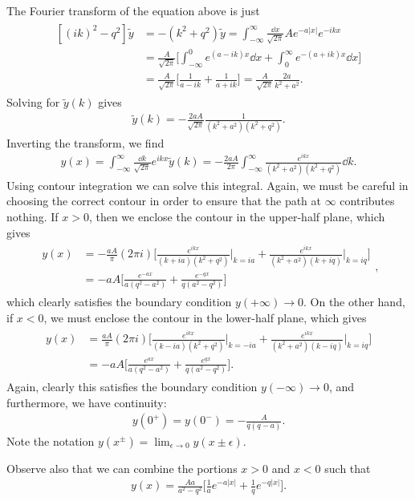 The Fourier transform of the equation above is just
\begin{eqnarray}
\begin{aligned}
    [ (ik)^2- q^2 ] \tilde{y} &= -(k^2+q^2)\tilde{y} = \int_{-\infty}^{\infty} \frac{\dd{x}}{\sqrt{2\pi}} A e^{-a|x|}e^{-ikx} \\
    &= \frac{A}{\sqrt{2\pi}} \Bigg[ \int_{-\infty}^{0} e^{(a-ik)x} \dd{x} + \int_{0}^{\infty} e^{-(a+ik)x} \dd{x} \Bigg] \\
    &= \frac{A}{\sqrt{2\pi}} \Bigg[ \frac{1}{a-ik} + \frac{1}{a+ik} \Bigg] = \frac{A}{\sqrt{2\pi}} \frac{2a}{k^2+a^2}
.\end{aligned}
\end{eqnarray}
Solving for $\tilde{y}(k)$ gives
\begin{eqnarray}
    \tilde{y}(k) = -\frac{2aA}{\sqrt{2\pi}} \frac{1}{(k^2+a^2)(k^2+q^2)}
.\end{eqnarray}
Inverting the transform, we find
\begin{eqnarray}
    y(x) = \int_{-\infty}^{\infty} \frac{\dd{k}}{\sqrt{2\pi}} e^{ikx} \tilde{y}(k) = -\frac{2aA}{2\pi} \int_{-\infty}^{\infty} \frac{e^{ikx}}{(k^2+a^2)(k^2+q^2)} \dd{k}
.\end{eqnarray}
Using contour integration we can solve this integral.
Again, we must be careful in choosing the correct contour in order to ensure that the path at $\infty$ contributes nothing.
If $x > 0$, then we enclose the contour in the upper-half plane, which gives
\begin{eqnarray}
\begin{aligned}        
    y(x) &= -\frac{aA}{\pi} (2 \pi i) \Bigg[ \frac{e^{ikx}}{(k+ia)(k^2+q^2)}\Big|_{k=ia} + \frac{e^{ikx}}{(k^2+a^2)(k+iq)}\Big|_{k=iq} \Bigg] \\
    &= -aA \Bigg[ \frac{e^{-ax}}{a(q^2 - a^2)} + \frac{e^{-qx}}{q(a^2-q^2)} \Bigg]
\end{aligned}
,\end{eqnarray}
which clearly satisfies the boundary condition $y(+\infty) \rightarrow 0$.
On the other hand, if $x < 0$, we must enclose the contour in the lower-half plane, which gives
\begin{eqnarray}
\begin{aligned}
    y(x) &= \frac{aA}{\pi} (2 \pi i) \Bigg[ \frac{e^{ikx}}{(k-ia)(k^2+q^2)}\Big|_{k=-ia} + \frac{e^{ikx}}{(k^2+a^2)(k-iq)}\Big|_{k=iq} \Bigg] \\
    &= -aA \Bigg[ \frac{e^{ax}}{a(q^2 - a^2)} + \frac{e^{qx}}{q(a^2 - q^2)} \Bigg]
.\end{aligned}
\end{eqnarray}
Again, clearly this satisfies the boundary condition $y(-\infty) \rightarrow 0$, and furthermore, we have continuity:
\begin{eqnarray}
    y(0^{+}) = y(0^{-}) = -\frac{A}{q(q-a)}
.\end{eqnarray}
Note the notation $y(x^{\pm}) = \lim_{\epsilon \rightarrow 0} y(x \pm \epsilon)$.

Observe also that we can combine the portions $x > 0$ and $x < 0$ such that
\begin{eqnarray}
    y(x) = \frac{Aa}{a^2 - q^2} \Bigg[ \frac{1}{a}e^{-a|x|} + \frac{1}{q} e^{-q|x|} \Bigg]
.\end{eqnarray}


